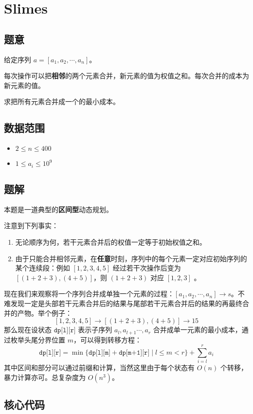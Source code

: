 \section{Slimes}
\subsection*{题意}
给定序列 $a = [a_1 ,a_2 ,\cdots, a_n]$。

每次操作可以把\textbf{相邻}的两个元素合并，新元素的值为权值之和。每次合并的成本为新元素的值。

求把所有元素合并成一个的最小成本。

\subsection*{数据范围}
\begin{itemize}
\item $2 \leq n \leq 400$
\item $1 \leq a_i \leq 10^9$
\end{itemize}

\subsection*{题解}

本题是一道典型的\textbf{区间型}动态规划。

注意到下列事实：
\begin{enumerate}
\item 无论顺序为何，若干元素合并后的权值一定等于初始权值之和。
\item 由于只能合并相邻元素，在\textbf{任意}时刻，序列中的每个元素一定对应初始序列的某个连续段：例如 $[1,2,3,4,5]$ 经过若干次操作后变为 $[(1+2+3),(4+5)]$，则 $(1+2+3)$ 对应 $[1,2,3]$ 。

\end{enumerate}
现在我们来观察将一个序列合并成单独一个元素的过程：$[a_1 ,a_2 ,\cdots, a_n] \rightarrow s$。不难发现一定是头部若干元素合并后的结果与尾部若干元素合并后的结果的再最终合并的产物。举个例子：
$$
[1,2,3,4,5] \rightarrow [(1+2+3),(4+5)] \rightarrow 15
$$那么现在设状态 ${\texttt{dp[l][r]}}$ 表示子序列 $a_l,a_{l+1}\cdots, a_r$ 合并成单一元素的最小成本，通过枚举头尾分界位置 $m$，可以得到转移方程：
$$
{\texttt{dp[l][r]}} = \min\{{\texttt{dp[l][m]}}+{\texttt{dp[m+1][r]}}\mid l\le m< r\} + \sum_{i = l}^r a_i
$$
其中区间和部分可以通过前缀和计算，当然这里由于每个状态有 $O(n)$ 个转移，暴力计算亦可。总复杂度为 $O(n^3)$。 





\newpage
\subsection*{核心代码}
\inputminted[linenos,autogobble]{cpp}{../Code/N.cpp}
\newpage